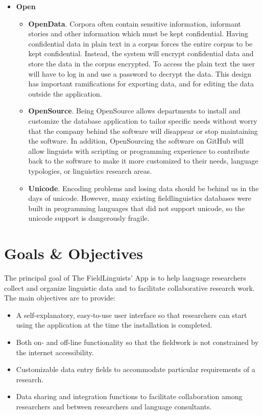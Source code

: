 \documentclass[12 pt]{article}
\begin{document}
\begin{itemize}
\item{\bf Open}
\begin{itemize}
\item {\bf OpenData}. Corpora often contain sensitive information, informant stories and other information which must be kept confidential. Having confidential data in plain text in a corpus forces the entire corpus to be kept confidential. Instead, the system will encrypt confidential data and store the data in the corpus encrypted. To access the plain text the user will have to log in and use a password to decrypt the data. This design has important ramifications for exporting data, and for editing the data outside the application.
\item { \bf OpenSource}. Being OpenSource allows departments to install and customize the database application to tailor specific needs without worry that the company behind the software will disappear or stop maintaining the software. In addition, OpenSourcing the software on GitHub will allow linguists with scripting or programming experience to contribute back to the software to make it more customized to their needs, language typologies, or linguistics research areas.
\item {\bf Unicode}. Encoding problems and losing data should be behind us in the days of unicode. However, many existing fieldlinguistics databases were built in programming languages that did not support unicode, so the unicode support is dangerously fragile.
\end{itemize}

\end{itemize}


\section {Goals \& Objectives}

The principal goal of The FieldLinguists' App is to help language researchers collect and organize linguistic data and to facilitate collaborative research work. The main objectives are to provide: 

\begin{itemize} 
\item A self-explanatory, easy-to-use user interface so that researchers can start using the application at the time the installation is completed.  
\item Both on- and off-line functionality so that the fieldwork is not constrained by the internet accessibility. 
\item Customizable data entry fields to accommodate particular requirements of a research.  
\item Data sharing and integration functions to facilitate collaboration among researchers and between researchers and language consultants. 

\end{itemize} 
\end{document}
